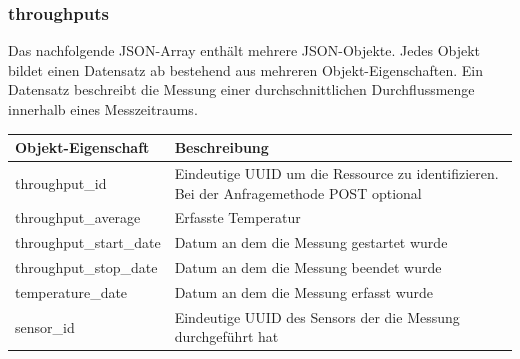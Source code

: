 \subsubsection{throughputs}%
\label{sec:rest.json.throughputs}
Das nachfolgende JSON-Array enthält mehrere JSON-Objekte. Jedes Objekt bildet einen Datensatz ab bestehend aus mehreren Objekt-Eigenschaften. Ein Datensatz beschreibt die Messung einer durchschnittlichen Durchflussmenge innerhalb eines Messzeitraums.

\begin{jsoncode}
\end{jsoncode}

\begin{table}[H]
  \begin{tabularx}{\textwidth}{lX}
    \textbf{Objekt-Eigenschaft} & \textbf{Beschreibung}                                                                     \\ \toprule
    throughput\_id              & Eindeutige UUID um die Ressource zu identifizieren. Bei der Anfragemethode POST optional  \\
    throughput\_average         & Erfasste Temperatur                                                                       \\
    throughput\_start\_date     & Datum an dem die Messung gestartet wurde                                                  \\
    throughput\_stop\_date      & Datum an dem die Messung beendet wurde                                                    \\
    temperature\_date           & Datum an dem die Messung erfasst wurde                                                    \\
    sensor\_id                  & Eindeutige UUID des Sensors der die Messung durchgeführt hat                              \\
  \end{tabularx}
\end{table}


